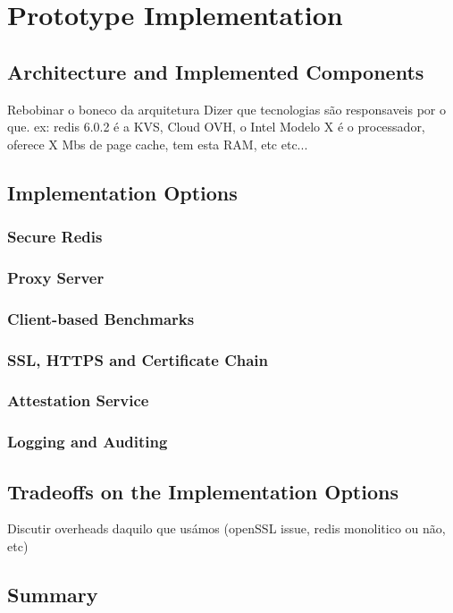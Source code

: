 
\chapter{Prototype Implementation}
\label{cha:elaboration_plan}

\section{Architecture and Implemented Components}
\label{sec:architecture_implementation_components}

Rebobinar o boneco da arquitetura
	Dizer que tecnologias são responsaveis por o que. ex: redis 6.0.2 é a KVS, Cloud OVH, o Intel Modelo X é o processador, oferece X Mbs de page cache, tem esta RAM, etc etc...

\section{Implementation Options}
\label{sec:implementation_options}

\subsection{Secure Redis}
\label{ssec:secure_redis}

\subsection{Proxy Server}
\label{ssec:proxy_server}

\subsection{Client-based Benchmarks}
\label{ssec:client_based_benchmarks}

\subsection{SSL, HTTPS and Certificate Chain}
\label{ssec:ssl_https_certificate_chain}

\subsection{Attestation Service}
\label{ssec:attestation_service}

\subsection{Logging and Auditing} 
\label{sec:logging_and_auditing}

\section{Tradeoffs on the Implementation Options}
\label{sec:tradeoffs_implementation_options}

Discutir overheads daquilo que usámos (openSSL issue, redis monolitico ou não, etc)

\section{Summary}
\label{sec:summary}